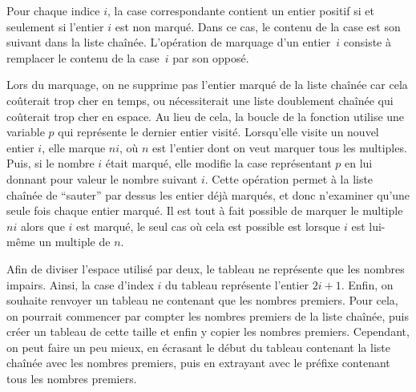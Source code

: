 \documentclass[a4paper]{easychair}
\begin{document}
Pour chaque indice $i$, la case correspondante contient un entier positif
si et seulement si l'entier $i$ est non marqué.
Dans ce cas, le contenu de la case est son
suivant dans la liste chaînée.
L'opération de marquage d'un entier~$i$ consiste à remplacer le
contenu de la case~$i$ par son opposé.

Lors du marquage, on ne supprime pas l'entier marqué de la liste chaînée car
cela coûterait trop cher en temps, ou nécessiterait une liste doublement
chaînée qui coûterait trop cher en espace.
Au lieu de cela, la boucle de la fonction 
utilise une variable $p$ qui représente le dernier entier visité.
Lorsqu'elle visite un nouvel entier $i$, elle marque $ni$, où $n$ est
l'entier dont on veut marquer tous les multiples.
Puis, si le nombre $i$ était marqué, elle modifie la case représentant $p$ en lui
donnant pour valeur le nombre suivant $i$. Cette opération permet à la liste
chaînée de ``sauter'' par dessus les entier déjà marqués, et donc n'examiner
qu'une seule fois chaque entier marqué.
Il est tout à fait possible de marquer le multiple $ni$ alors que $i$ est marqué,
le seul cas où cela est possible est lorsque $i$ est lui-même un multiple de $n$.

Afin de diviser l'espace utilisé par deux, le tableau ne représente que les nombres
impairs. Ainsi, la case d'index $i$ du tableau représente l'entier $2i + 1$.
Enfin, on souhaite renvoyer un tableau ne contenant que les nombres premiers.
Pour cela, on pourrait commencer par compter les nombres premiers
de la liste chaînée, puis créer un tableau de cette taille et enfin y copier
les nombres premiers.
Cependant, on peut faire un peu mieux, en écrasant le début du tableau
contenant la liste chaînée avec les nombres premiers, puis en
extrayant avec  le préfixe contenant tous les nombres premiers.
\end{document}
